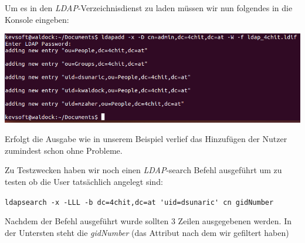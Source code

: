 Um es in den \textit{LDAP}-Verzeichnisdienst zu laden müssen wir nun folgendes in die Konsole eingeben: 
\begin{center}
	\includegraphics[width=1.0\linewidth]{images/a3_ldapadd.PNG}
\end{center}

Erfolgt die Ausgabe wie in unserem Beispiel verlief das Hinzufügen der Nutzer zumindest schon ohne Probleme.

Zu Testzwecken haben wir noch einen \textit{LDAP}-search Befehl ausgeführt um zu testen ob die User tatsächlich angelegt sind:

\verb|ldapsearch -x -LLL -b dc=4chit,dc=at 'uid=dsunaric' cn gidNumber|

Nachdem der Befehl ausgeführt wurde sollten 3 Zeilen ausgegebenen werden. In der Untersten steht die \textit{gidNumber} (das Attribut nach dem wir gefiltert haben)